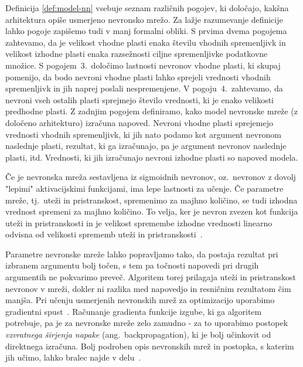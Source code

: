 \documentclass[12pt,a4paper,twoside]{article}
\theoremstyle{definition} %
\theoremstyle{plain} %
\numberwithin{equation}{section}  %
\begin{document}
Definicija \ref{def:model-nn} vsebuje seznam različnih pogojev, ki določajo, kakšna arhitektura opiše usmerjeno nevronsko mrežo. 
Za lažje razumevanje definicije lahko pogoje zapišemo tudi v manj formalni obliki.
S prvima dvema pogojema zahtevamo, da je velikost vhodne plasti enaka številu vhodnih spremenljivk in velikost izhodne plasti enaka razsežnosti ciljne spremenljivke podatkovne množice.
S pogojem~3.\ določimo lastnosti nevronov vhodne plasti, ki skupaj pomenijo, da bodo nevroni vhodne plasti lahko sprejeli vrednosti vhodnih spremenljivk in jih naprej poslali nespremenjene.
V pogoju~4.\ zahtevamo, da nevroni vseh ostalih plasti sprejmejo število vrednosti, ki je enako velikosti predhodne plasti.
Z zadnjim pogojem definiramo, kako model nevronske mreže (z določeno arhitekturo) izračuna napoved.
Nevroni vhodne plasti sprejemejo vrednosti vhodnih spremenljivk, ki jih nato podamo kot argument nevronom naslednje plasti, rezultat, ki ga izračunajo, pa je argument nevronov naslednje plasti, itd.
Vrednosti, ki jih izračunajo nevroni izhodne plasti so napoved modela.

Če je nevronska mreža sestavljena iz sigmoidnih nevronov, oz.~nevronov z dovolj "lepimi" aktivacijskimi funkcijami, ima lepe lastnosti za učenje. 
Če parametre mreže, tj.~uteži in pristranskost, spremenimo za majhno količino, se tudi izhodna vrednost spremeni za majhno količino. 
To velja, ker je nevron zvezen kot funkcija uteži in pristranskosti in je velikost spremembe izhodne vrednosti linearno odvisna od velikosti sprememb uteži in pristranskosti~\cite[pogl.\ 1]{nielsen2015neural}.

Parametre nevronske mreže lahko popravljamo tako, da postaja rezultat pri izbranem argumentu bolj točen, s tem pa točnosti napovedi pri drugih argumentih ne pokvarimo preveč. 
Algoritem torej prilagaja uteži in pristranskost nevronov v mreži, dokler ni razlika med napovedjo in resničnim rezultatom čim manjša. 
Pri učenju usmerjenih nevronskih mrež za optimizacijo uporabimo gradientni spust~\cite[pogl.\ 1]{nielsen2015neural}.
Računanje gradienta funkcije izgube, ki ga algoritem potrebuje, pa je za nevronske mreže zelo zamudno - za to uporabimo postopek \emph{vzvratnega širjenja napake} (ang.~backpropagation), ki je bolj učinkovit od direktnega izračuna. %
Bolj podroben opis nevronskih mrež in postopka, s katerim jih učimo, lahko bralec najde v delu~\cite[pogl.\ 2]{nielsen2015neural}.
\end{document}
